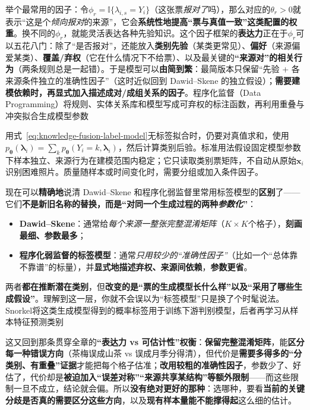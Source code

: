 举个最常用的因子：令$\phi_r=\mathbb{I}\{\lambda_{i,s}=Y_i\}$（这张票\emph{报对了}吗），那么对应的$\theta_r>0$就表示“这是个\emph{倾向报对}的来源”，它会\textbf{系统性地提高“票与真值一致”这类配置的权重}。换不同的$\phi_r$，就能灵活表达各种先验知识。这个因子框架的\textbf{表达力}正在于$\phi_r$可以五花八门：除了“是否报对”，还能放入\textbf{类别先验}（某类更常见）、\textbf{偏好}（来源偏爱某类）、\textbf{覆盖/弃权}（它在什么情况下不给票）、以及最关键的\textbf{“来源对”的相关行为}（两条规则总是一起错）。于是模型可以\textbf{由简到繁}：最简版本只保留“先验 + 各来源条件独立的准确性因子”（这时近似回到 Dawid--Skene 的独立假设）；\textbf{需要建模依赖时，再显式加入描述成对/成组关系的因子}。程序化监督（Data Programming）将规则、实体关系库和模型写成可弃权的标注函数，再利用重叠与冲突拟合生成模型参数

用式~\eqref{eq:knowledge-fusion-label-model}无标签拟合时，仍要对真值求和，使用$p_{\bm{\theta}}(\bm{\lambda}_i)=\sum_kp_{\bm{\theta}}(Y_i=k,\bm{\lambda}_i)$，然后计算类别后验。标准用法假设固定模型参数下样本独立、来源行为在建模范围内稳定；它只读取类别票矩阵，不自动从原始$\bm{x}_i$识别困难照片。质量随样本或时间变化时，需要分组或加入条件因子。

\Needspace{70mm}
现在可以\textbf{精确地}说清 Dawid--Skene 和程序化弱监督里常用标签模型的\textbf{区别}了——它们\textbf{不是新旧名称的替换，而是“对同一个生成过程的两种\emph{参数化}”}：
\begin{itemize}\item \textbf{Dawid--Skene}：通常给\emph{每个来源一整张完整混淆矩阵}（$K\times K$个格子），\textbf{刻画最细、参数最多}；\item \textbf{程序化弱监督的标签模型}：通常\emph{只用较少的“准确性因子”}（比如一个“总体靠不靠谱”的标量），并\textbf{显式地描述弃权、来源间依赖}，\textbf{参数更省}。\end{itemize}
两者\textbf{都在推断潜在类别}，但\textbf{改变的是“票的生成模型长什么样”以及“采用了哪些生成假设”}。理解到这一层，你就不会误以为“标签模型”只是换了个时髦说法。Snorkel将这类生成模型得到的概率标签用于训练下游判别模型，后者再学习从样本特征预测类别

这又回到那条贯穿全章的\textbf{“表达力 vs 可估计性”权衡}：\textbf{保留完整混淆矩阵}，能\textbf{区分每一种错误方向}（茶梅误成山茶 vs 误成月季分得清），但代价是\textbf{需要多得多的“分类别、有重叠”证据}才能把每个格子估准；\textbf{改用较粗的准确性因子}，参数少了、好估了，代价却是\textbf{被迫加入“误差对称”“来源共享某结构”等额外限制}——而这些限制一旦不成立，结论就会偏。所以\textbf{没有绝对更好的那种}：选哪种，要看\textbf{当前的关键分歧是否真的需要区分这些方向}，以及\textbf{现有样本量能不能撑得起}这么细的估计。


